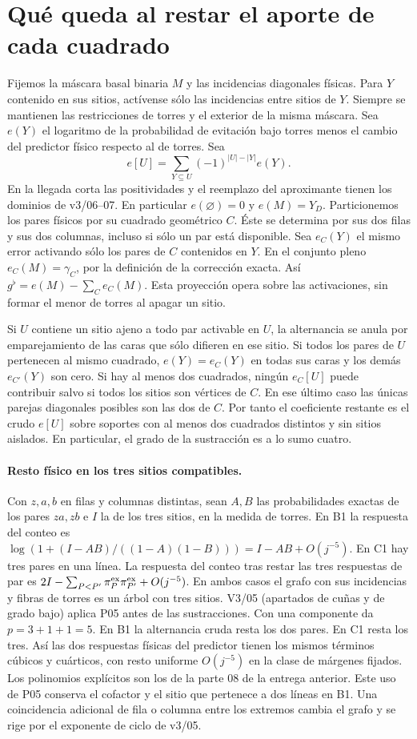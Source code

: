 \section*{Qué queda al restar el aporte de cada cuadrado}
Fijemos la máscara basal binaria \(M\) y las incidencias diagonales físicas.
Para \(Y\) contenido en sus sitios, actívense sólo las incidencias entre sitios de \(Y\).
Siempre se mantienen las restricciones de torres y el exterior de la misma máscara.
Sea \(e(Y)\) el logaritmo de la probabilidad de evitación bajo torres menos
el cambio del predictor físico respecto al de torres. Sea
\[
 e[U]=\sum_{Y\subseteq U}(-1)^{|U|-|Y|}e(Y).
\]
En la llegada corta las positividades y el reemplazo del aproximante tienen
los dominios de v3/06--07. En particular \(e(\varnothing)=0\) y \(e(M)=Y_D\).
Particionemos los pares físicos por su cuadrado geométrico \(C\). Éste se determina
por sus dos filas y sus dos columnas, incluso si sólo un par está disponible.
Sea \(e_C(Y)\) el mismo error activando sólo los pares de \(C\) contenidos en \(Y\).
En el conjunto pleno \(e_C(M)=\gamma_C\), por la definición de la corrección exacta.
Así \(g^\flat=e(M)-\sum_C e_C(M)\). Esta proyección opera sobre las activaciones,
sin formar el menor de torres al apagar un sitio.

Si \(U\) contiene un sitio ajeno a todo par activable en \(U\), la alternancia
se anula por emparejamiento de las caras que sólo difieren en ese sitio.
Si todos los pares de \(U\) pertenecen al mismo cuadrado, \(e(Y)=e_C(Y)\) en
todas sus caras y los demás \(e_{C'}(Y)\) son cero. Si hay al menos dos cuadrados,
ningún \(e_C[U]\) puede contribuir salvo si todos los sitios son vértices de \(C\).
En ese último caso las únicas parejas diagonales posibles son las dos de \(C\).
Por tanto el coeficiente restante es el crudo \(e[U]\) sobre soportes con al menos
dos cuadrados distintos y sin sitios aislados. En particular, el grado de la
sustracción es a lo sumo cuatro.

\paragraph{Resto físico en los tres sitios compatibles.}
Con \(z,a,b\) en filas y columnas distintas, sean \(A,B\) las probabilidades
exactas de los pares \(za,zb\) e \(I\) la de los tres sitios, en la medida de torres.
En B1 la respuesta del conteo es
\(\log(1+(I-AB)/((1-A)(1-B)))= I-AB+O(j^{-5})\).
En C1 hay tres pares en una línea. La respuesta del conteo tras restar las
tres respuestas de par es \(2I-\sum_{P<P'}\pi^{\rm ex}_P\pi^{\rm ex}_{P'}+O(j^{-5})\).
En ambos casos el grafo con sus incidencias y fibras de torres es un árbol con
tres sitios. V3/05 (apartados de cuñas y de grado bajo) aplica P05 antes de
las sustracciones. Con una componente da \(p=3+1+1=5\).
En B1 la alternancia cruda resta los dos pares. En C1 resta los tres.
Así las dos respuestas físicas del predictor tienen los mismos términos cúbicos
y cuárticos, con resto uniforme \(O(j^{-5})\) en la clase de márgenes fijados.
Los polinomios explícitos son los de la parte 08 de la entrega anterior.
Este uso de P05 conserva el cofactor y el sitio que pertenece a dos líneas en B1.
Una coincidencia adicional de fila o columna entre los extremos cambia el grafo
y se rige por el exponente de ciclo de v3/05.
